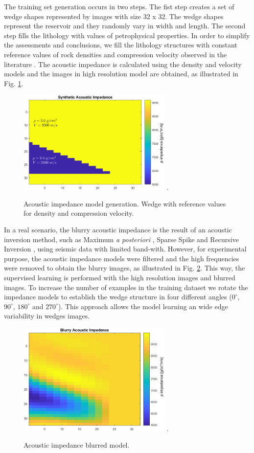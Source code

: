 \documentclass[conference]{IEEEtran}
\begin{document}
The training set generation occurs in two steps.
The fist step creates a set of wedge shapes represented
by images with size $32$ x $32$. The wedge shapes represent the reservoir and they
randomly vary in width and length. The second step fills the lithology with values of petrophysical properties.
In order to simplify the assessments and conclusions, we fill the lithology structures with constant
reference values of rock densities and compression velocity observed in the literature \cite{Mavko2009}.
The acoustic impedance is calculated using the density and velocity models and the images in high
resolution model are obtained, as illustrated in  Fig. \ref{fig_lithology}.
\begin{figure}[!t]
\centering
\includegraphics[width=3.0in]{Figs/image_cunha}
\DeclareGraphicsExtensions.
\caption{Acoustic impedance model generation. Wedge with reference values for density and compression velocity.}
\label{fig_lithology}
\end{figure}

In a real scenario, the blurry acoustic impedance is the
result of an acoustic inversion method, such as Maximum \textit{a posteriori} \cite{Buland2003,Figueiredo2012}, Sparse Spike \cite{Debeye1990} 
and Recursive Inversion \cite{Chopra2001}, using seismic data with limited band-with.
However, for experimental purpose, the acoustic impedance models were filtered
and the high frequencies were removed to obtain the blurry images, as illustrated in Fig. \ref{fig_blur}.
This way, the supervised learning is performed with the high resolution images and blurred images.
To increase the number of examples in the training dataset we rotate
the impedance models to establish the wedge structure in four different angles
($0^{\circ}$, $90^{\circ}$, $180^{\circ}$ and $270^{\circ}$).
This approach allows the model learning an wide edge variability in wedges images.
\begin{figure}[!t]
\centering
\includegraphics[width=3.0in]{Figs/image_cunha_blurry}
\DeclareGraphicsExtensions.
\caption{Acoustic impedance blurred model.}
\label{fig_blur}
\end{figure}
\end{document}
